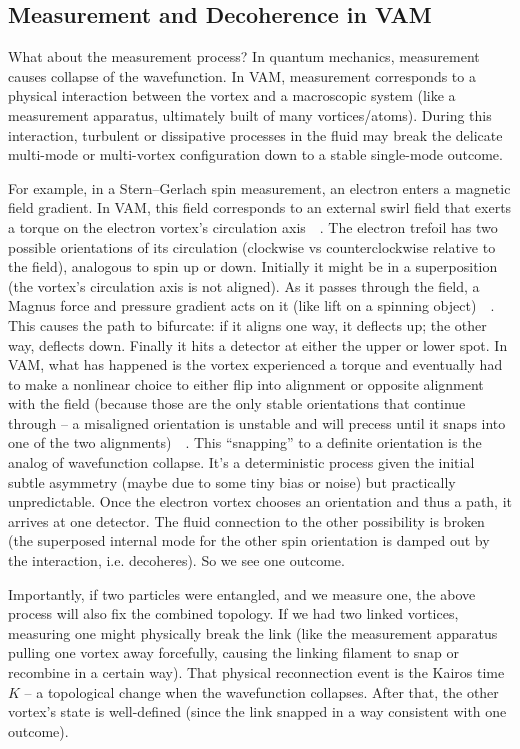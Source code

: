 \documentclass[preprint]{revtex4-2}
\begin{document}
    \subsection{Measurement and Decoherence in VAM}
    What about the measurement process? In quantum mechanics, measurement causes collapse of the wavefunction. In VAM, measurement corresponds to a physical interaction between the vortex and a macroscopic system (like a measurement apparatus, ultimately built of many vortices/atoms). During this interaction, turbulent or dissipative processes in the fluid may break the delicate multi-mode or multi-vortex configuration down to a stable single-mode outcome.

    For example, in a Stern–Gerlach spin measurement, an electron enters a magnetic field gradient. In VAM, this field corresponds to an external swirl field that exerts a torque on the electron vortex’s circulation axis~\cite{reference_109}~\cite{reference_110}. The electron trefoil has two possible orientations of its circulation (clockwise vs counterclockwise relative to the field), analogous to spin up or down. Initially it might be in a superposition (the vortex’s circulation axis is not aligned). As it passes through the field, a Magnus force and pressure gradient acts on it (like lift on a spinning object)~\cite{reference_111}~\cite{reference_112}. This causes the path to bifurcate: if it aligns one way, it deflects up; the other way, deflects down. Finally it hits a detector at either the upper or lower spot. In VAM, what has happened is the vortex experienced a torque and eventually had to make a nonlinear choice to either flip into alignment or opposite alignment with the field (because those are the only stable orientations that continue through – a misaligned orientation is unstable and will precess until it snaps into one of the two alignments)~\cite{reference_113}~\cite{reference_114}. This “snapping” to a definite orientation is the analog of wavefunction collapse. It’s a deterministic process given the initial subtle asymmetry (maybe due to some tiny bias or noise) but practically unpredictable. Once the electron vortex chooses an orientation and thus a path, it arrives at one detector. The fluid connection to the other possibility is broken (the superposed internal mode for the other spin orientation is damped out by the interaction, i.e. decoheres). So we see one outcome.

    Importantly, if two particles were entangled, and we measure one, the above process will also fix the combined topology. If we had two linked vortices, measuring one might physically break the link (like the measurement apparatus pulling one vortex away forcefully, causing the linking filament to snap or recombine in a certain way). That physical reconnection event is the Kairos time $K$ – a topological change when the wavefunction collapses. After that, the other vortex’s state is well-defined (since the link snapped in a way consistent with one outcome).
\end{document}
